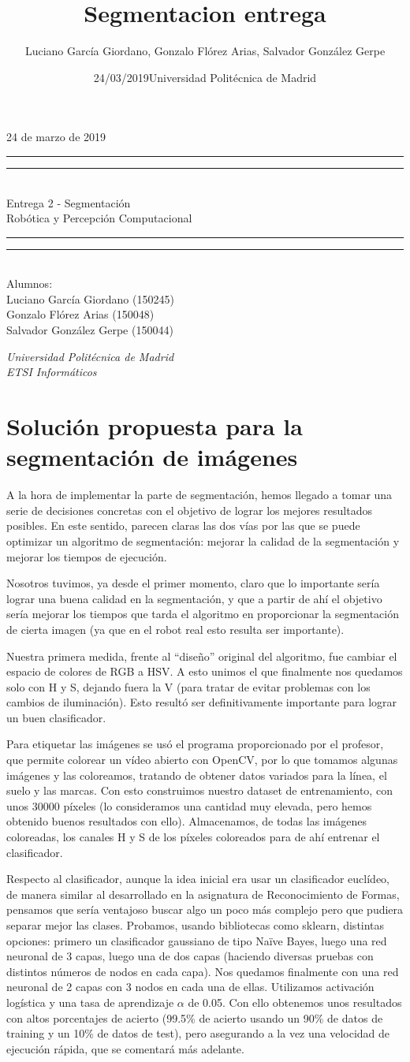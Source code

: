 \documentclass{article}
\title{Segmentacion entrega}
\author{Luciano García Giordano, Gonzalo Flórez Arias, Salvador González Gerpe}
\date{24/03/2019}
\date{Universidad Politécnica de Madrid}
\newcommand*{\frontPageEC}[2]{
    \begingroup %
        \centering %
        \vspace*{\baselineskip} %
        {\begin{flushright} \LARGE #1  \end{flushright}}
        \vspace*{\baselineskip}
        \rule{\textwidth}{1.6pt}\vspace*{-\baselineskip}\vspace*{2pt} %
        \rule{\textwidth}{0.4pt}\\[\baselineskip] %
        {\LARGE #2  \\[0.8\baselineskip] \large{Robótica y Percepción Computacional}}\\[0.2\baselineskip] %
        \rule{\textwidth}{0.4pt}\vspace*{-\baselineskip}\vspace{3.2pt} %
        \rule{\textwidth}{1.6pt}\\[\baselineskip] %
        \vspace*{2\baselineskip} %
        Alumnos: \\[\baselineskip]
        {\Large Luciano García Giordano (150245)} \\
        {\Large Gonzalo Flórez Arias (150048)} \\
        {\Large Salvador González Gerpe (150044)} \\
        
        \vfill
        
        {\itshape Universidad Politécnica de Madrid \\ ETSI Informáticos\par} %
    \endgroup}
\begin{document}
\frontPageEC{24 de marzo de 2019}{Entrega 2 - Segmentación}
\thispagestyle{empty}

\newpage
\tableofcontents
\setcounter{page}{1}

\clearpage
\newpage

\section{Solución propuesta para la segmentación de imágenes}

	A la hora de implementar la parte de segmentación, hemos llegado a tomar una serie de decisiones concretas con el objetivo de lograr los mejores resultados posibles. En este sentido, parecen claras las dos vías por las que se puede optimizar un algoritmo de segmentación: mejorar la calidad de la segmentación y mejorar los tiempos de ejecución.

	Nosotros tuvimos, ya desde el primer momento, claro que lo importante sería lograr una buena calidad en la segmentación, y que a partir de ahí el objetivo sería mejorar los tiempos que tarda el algoritmo en proporcionar la segmentación de cierta imagen (ya que en el robot real esto resulta ser importante). 

	Nuestra primera medida, frente al “diseño” original del algoritmo, fue cambiar el espacio de colores de RGB a HSV. A esto unimos el que finalmente nos quedamos solo con H y S, dejando fuera la V (para tratar de evitar problemas con los cambios de iluminación). Esto resultó ser definitivamente importante para lograr un buen clasificador.

	Para etiquetar las imágenes se usó el programa proporcionado por el profesor, que permite colorear un vídeo abierto con OpenCV, por lo que tomamos algunas imágenes y las coloreamos, tratando de obtener datos variados para la línea, el suelo y las marcas. Con esto construimos nuestro dataset de entrenamiento, con unos 30000 píxeles (lo consideramos una cantidad muy elevada, pero hemos obtenido buenos resultados con ello). Almacenamos, de todas las imágenes coloreadas, los canales H y S de los píxeles coloreados para de ahí entrenar el clasificador.

	Respecto al clasificador, aunque la idea inicial era usar un clasificador euclídeo, de manera similar al desarrollado en la asignatura de Reconocimiento de Formas, pensamos que sería ventajoso buscar algo un poco más complejo pero que pudiera separar mejor las clases. Probamos, usando bibliotecas como sklearn, distintas opciones: primero un clasificador gaussiano de tipo Naïve Bayes, luego una red neuronal de 3 capas, luego una de dos capas (haciendo diversas pruebas con distintos números de nodos en cada capa). Nos quedamos finalmente con una red neuronal de 2 capas con 3 nodos en cada una de ellas. Utilizamos activación logística y una tasa de aprendizaje $\alpha$ de 0.05. Con ello obtenemos unos resultados con altos porcentajes de acierto (99.5\% de acierto usando un 90\% de datos de training y un 10\% de datos de test), pero asegurando a la vez una velocidad de ejecución rápida, que se comentará más adelante.
\end{document}
